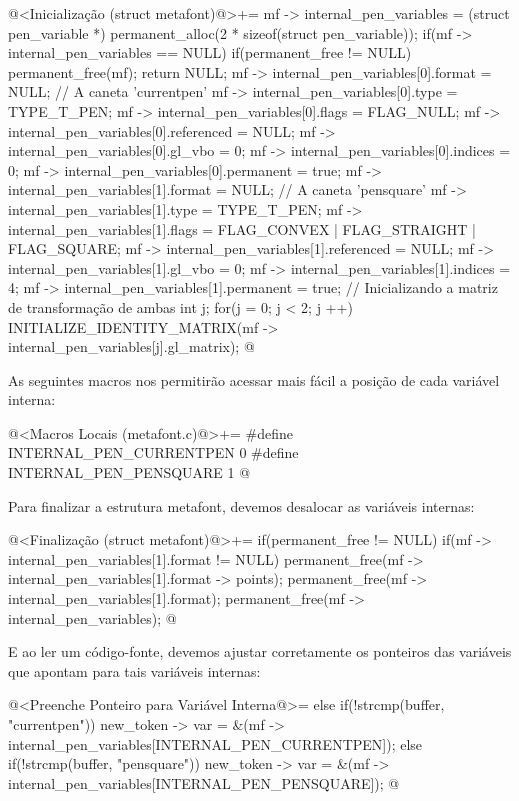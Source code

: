 \iniciocodigo
@<Inicialização (struct metafont)@>+=
mf -> internal_pen_variables = (struct pen_variable *)
                                 permanent_alloc(2 * sizeof(struct pen_variable));
if(mf -> internal_pen_variables == NULL){
  if(permanent_free != NULL)
    permanent_free(mf);
  return NULL;
}
mf -> internal_pen_variables[0].format = NULL; // A caneta 'currentpen'
mf -> internal_pen_variables[0].type = TYPE_T_PEN;
mf -> internal_pen_variables[0].flags = FLAG_NULL;
mf -> internal_pen_variables[0].referenced = NULL;
mf -> internal_pen_variables[0].gl_vbo = 0;
mf -> internal_pen_variables[0].indices = 0;
mf -> internal_pen_variables[0].permanent = true;
mf -> internal_pen_variables[1].format = NULL; // A caneta 'pensquare'
mf -> internal_pen_variables[1].type = TYPE_T_PEN;
mf -> internal_pen_variables[1].flags = FLAG_CONVEX | FLAG_STRAIGHT |
                                        FLAG_SQUARE;
mf -> internal_pen_variables[1].referenced = NULL;
mf -> internal_pen_variables[1].gl_vbo = 0;
mf -> internal_pen_variables[1].indices = 4;
mf -> internal_pen_variables[1].permanent = true;
{ // Inicializando a matriz de transformação de ambas
  int j;
  for(j = 0; j < 2; j ++)
    INITIALIZE_IDENTITY_MATRIX(mf -> internal_pen_variables[j].gl_matrix);
}
@
\fimcodigo

As seguintes macros nos permitirão acessar mais fácil a posição de
cada variável interna:

\iniciocodigo
@<Macros Locais (metafont.c)@>+=
#define INTERNAL_PEN_CURRENTPEN 0
#define INTERNAL_PEN_PENSQUARE  1
@
\fimcodigo

Para finalizar a estrutura metafont, devemos desalocar as variáveis
internas:

\iniciocodigo
@<Finalização (struct metafont)@>+=
if(permanent_free != NULL){
  if(mf -> internal_pen_variables[1].format != NULL){
    permanent_free(mf -> internal_pen_variables[1].format -> points);
    permanent_free(mf -> internal_pen_variables[1].format);
  }
  permanent_free(mf -> internal_pen_variables);
}
@
\fimcodigo

E ao ler um código-fonte, devemos ajustar corretamente os ponteiros
das variáveis que apontam para tais variáveis internas:

\iniciocodigo
@<Preenche Ponteiro para Variável Interna@>=
else if(!strcmp(buffer, "currentpen"))
  new_token -> var =
          &(mf -> internal_pen_variables[INTERNAL_PEN_CURRENTPEN]);
else if(!strcmp(buffer, "pensquare"))
  new_token -> var =
          &(mf -> internal_pen_variables[INTERNAL_PEN_PENSQUARE]);
@
\fimcodigo

